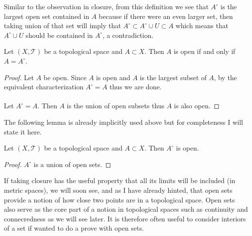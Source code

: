 \documentclass[a4paper]{article}
\begin{document}
Similar to the observation in closure, from this definition we see that $A^\circ$ is the largest open set contained in $A$ because if there were an even larger set, then taking union of that set will imply that $A^\circ\subset A^\circ\cup U\subset A$ which means that $A^\circ\cup U$ should be contained in $A^\circ$, a contradiction. 

\begin{prp}{}{} Let $(X,\mathcal{T})$ be a topological space and $A\subset X$. Then $A$ is open if and only if $A=A^\circ$. \tcbline
\begin{proof}
Let $A$ be open. Since $A$ is open and $A$ is the largest subset of $A$, by the equivalent characterization $A^\circ=A$ thus we are done. \\~\\
Let $A^\circ=A$. Then $A$ is the union of open subsets thus $A$ is also open. 
\end{proof}
\end{prp}

The following lemma is already implicitly used above but for completeness I will state it here. 

\begin{lmm}{}{} Let $(X,\mathcal{T})$ be a topological space and $A\subset X$. Then $A^\circ$ is open. \tcbline
\begin{proof}
$A^\circ$ is a union of open sets. 
\end{proof}
\end{lmm}

If taking closure has the useful property that all its limits will be included (in metric spaces), we will soon see, and as I have already hinted, that open sets provide a notion of how close two points are in a topological space. Open sets also serve as the core part of a notion in topological spaces such as continuity and connecredness as we will see later. It is therefore often useful to consider interiors of a set if wanted to do a prove with open sets. 
\end{document}
